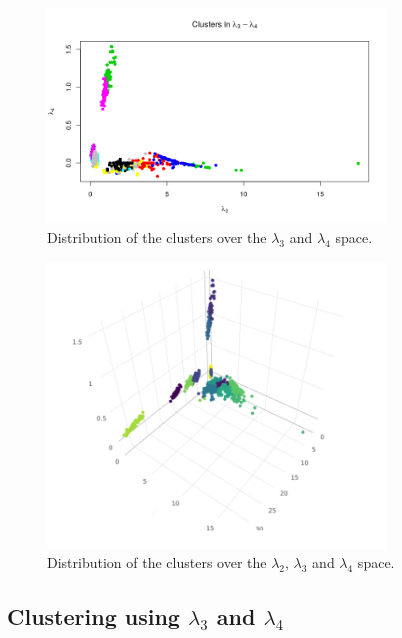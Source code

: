 \begin{figure}[H]
    \centering
    \includegraphics[width=0.8\textwidth]{img/gld_clustering/Dataset2/nuevo/l3_l4.png}
    \caption{Distribution of the clusters over the $\lambda_{3}$ and $\lambda_{4}$ space.}
    \label{fig:dataset2_l2l3l4_l2_l3_l4}
\end{figure}

\begin{figure}[H]
    \centering
    \includegraphics[width=0.8\textwidth]{img/gld_clustering/Dataset2/nuevo/l2_l3_l4_cortado.png}
    \caption{Distribution of the clusters over the $\lambda_{2}$,  $\lambda_{3}$ and $\lambda_{4}$ space.}
    \label{fig:dataset2_l2l3l4_l2_l3_l4}
\end{figure}

\subsection{Clustering using $\lambda_{3}$ and $\lambda_{4}$}\label{syntheticI_l34}
 
